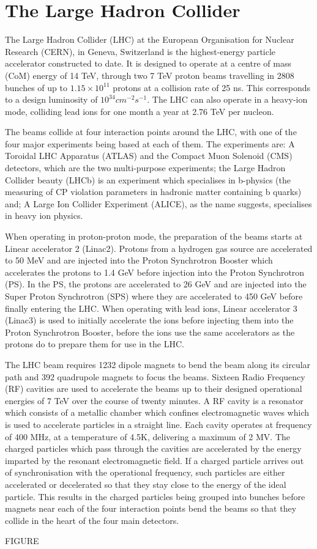 \section{The Large Hadron Collider}\label{sec:lhc}

The Large Hadron Collider (LHC) at the European Organisation for Nuclear Research (CERN), in Geneva, Switzerland is the highest-energy particle accelerator constructed to date. 
It is designed to operate at a centre of mass (CoM) energy of 14 TeV, through two 7 TeV proton beams travelling in 2808 bunches of up to $1.15 \times 10^{11}$ protons at a collision rate of 25 ns. 
This corresponds to a design luminosity of $10^{34}cm^{-2}s^{-1}$. 
The LHC can also operate in a heavy-ion mode, colliding lead ions for one month a year at 2.76 TeV per nucleon. 

The beams collide at four interaction points around the LHC, with one of the four major experiments being based at each of them. 
The experiments are: A Toroidal LHC Apparatus (ATLAS) and the Compact Muon Solenoid (CMS) detectors, which are the two multi-purpose experiments; the Large Hadron Collider beauty (LHCb) is an experiment which specialises in b-physics (the measuring of CP violation parameters in hadronic matter containing b quarks) and; A Large Ion Collider Experiment (ALICE), as the name suggests, specialises in heavy ion physics. 

When operating in proton-proton mode, the preparation of the beams starts at Linear accelerator 2 (Linac2). 
Protons from a hydrogen gas source are accelerated to 50 MeV and are injected into the Proton Synchrotron Booster which accelerates the protons to 1.4 GeV before injection into the Proton Synchrotron (PS). 
In the PS, the protons are accelerated to 26 GeV and are injected into the Super Proton Synchrotron (SPS) where they are accelerated to 450 GeV before finally entering the LHC. 
When operating with lead ions, Linear accelerator 3 (Linac3) is used to initially accelerate the ions before injecting them into the Proton Synchrotron Booster, before the ions use the same accelerators as the protons do to prepare them for use in the LHC. 

The LHC beam requires 1232 dipole magnets to bend the beam along its circular path and 392 quadrupole magnets to focus the beams. 
Sixteen Radio Frequency (RF) cavities are used to accelerate the beams up to their designed operational energies of 7 TeV over the course of twenty minutes. 
A RF cavity is a resonator which consists of a metallic chamber which confines electromagnetic waves which is used to accelerate particles in a straight line. 
Each cavity operates at frequency of 400 MHz, at a temperature of 4.5K, delivering a maximum of 2 MV. 
The charged particles which pass through the cavities are accelerated by the energy imparted by the resonant electromagnetic field. 
If a charged particle arrives out of synchronisation with the operational frequency, such particles are either accelerated or decelerated so that they stay close to the energy of the ideal particle. 
This results in the charged particles being grouped into bunches before magnets near each of the four interaction points bend the beams so that they collide in the heart of the four main detectors. 

FIGURE
